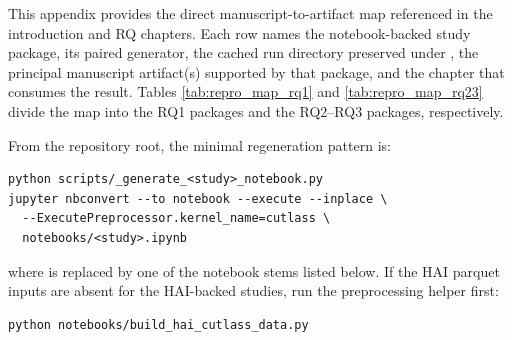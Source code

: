 \label{app:reproducibility_map}

This appendix provides the direct manuscript-to-artifact map referenced in the introduction and RQ chapters. Each row names the notebook-backed study package, its paired generator, the cached run directory preserved under , the principal manuscript artifact(s) supported by that package, and the chapter that consumes the result. Tables \ref{tab:repro_map_rq1} and \ref{tab:repro_map_rq23} divide the map into the RQ1 packages and the RQ2--RQ3 packages, respectively.

From the repository root, the minimal regeneration pattern is:
\begin{verbatim}
python scripts/_generate_<study>_notebook.py
jupyter nbconvert --to notebook --execute --inplace \
  --ExecutePreprocessor.kernel_name=cutlass \
  notebooks/<study>.ipynb
\end{verbatim}
where  is replaced by one of the notebook stems listed below. If the HAI parquet inputs are absent for the HAI-backed studies, run the preprocessing helper first:
\begin{verbatim}
python notebooks/build_hai_cutlass_data.py
\end{verbatim}

